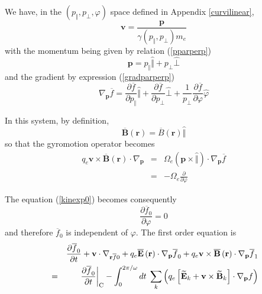 We have, in the $\left( p_{\Vert },p_{\bot },\varphi \right) $ space defined
in Appendix \ref{curvilinear},
\begin{equation}
\mathbf{v}=\frac{\mathbf{p}}{\gamma \left( p_{\Vert },p_{\bot }\right) m_{e}}
\end{equation}
with the momentum being given by relation (\ref{pparperp})
\begin{equation}
\mathbf{p}=p_{\Vert }\widehat{\Vert }+p_{\bot }\widehat{\bot }
\end{equation}
and the gradient by expression (\ref{gradparperp})
\begin{equation}
\nabla _{\mathbf{p}}\overline{f}=\frac{\partial \overline{f}}{\partial
p_{\Vert }}\widehat{\Vert }+\frac{\partial \overline{f}}{\partial p_{\bot }}%
\widehat{\bot }+\frac{1}{p_{\bot }}\frac{\partial \overline{f}}{\partial
\varphi }\widehat{\varphi }  \label{gradparperp2}
\end{equation}

In this system, by definition,
\begin{equation}
\overline{\mathbf{B}}\left( \mathbf{r}\right) =\overline{B}\left( \mathbf{r}%
\right) \widehat{\Vert }
\end{equation}
so that the gyromotion operator becomes
\begin{eqnarray}
q_{e}\mathbf{v}\times \overline{\mathbf{B}}\left( \mathbf{r}\right) \cdot
\nabla _{\mathbf{p}} &=&\Omega _{e}\left( \mathbf{p}\times \widehat{\Vert }
\right) \cdot \nabla _{\mathbf{p}}\overline{f}  \nonumber \\
&=&-\Omega _{e}\frac{\partial }{\partial \varphi }  \label{gyromotion}
\end{eqnarray}

The equation (\ref{kinexp0}) becomes consequently
\begin{equation}
\frac{\partial \overline{f}_{0}}{\partial \varphi }=0  \label{ftilde0phi}
\end{equation}
and therefore $\overline{f}_{0}$ is independent of $\varphi $. The first
order equation is
\begin{eqnarray}
&&\frac{\partial \overline{f}_{0}}{\partial t}+\mathbf{v}\cdot \nabla _{%
\mathbf{r}\overline{f}0}+q_{e}\overline{\mathbf{E}}\left( \mathbf{r}\right)
\cdot \nabla _{\mathbf{p}}\overline{f}_{0}+q_{e}\mathbf{v}\times \overline{%
\mathbf{B}}\left( \mathbf{r}\right) \cdot \nabla _{\mathbf{p}}\overline{f}%
_{1}  \nonumber \\
&=&\left. \frac{\partial \overline{f}_{0}}{\partial t}\right| _{\text{C}%
}-\int_{0}^{2\pi /\omega }dt\;\sum_{k}\left( q_{e}\left[ \widetilde{\mathbf{E%
}}_{k}+\mathbf{v}\times \widetilde{\mathbf{B}}_{k}\right] \cdot \nabla _{%
\mathbf{p}}f\right)  \label{kinexp}
\end{eqnarray}

